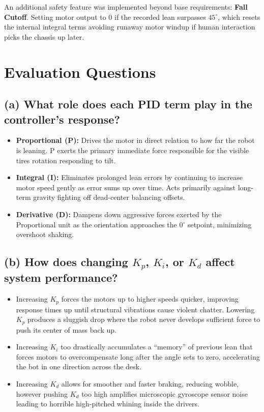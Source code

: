 \documentclass[12pt,a4paper]{article}
\begin{document}
An additional safety feature was implemented beyond base requirements: \textbf{Fall Cutoff}. Setting motor output to 0 if the recorded lean surpasses $45^\circ$, which resets the internal integral terms avoiding runaway motor windup if human interaction picks the chassis up later.

\section{Evaluation Questions}

\subsection{(a) What role does each PID term play in the controller's response?}
\begin{itemize}
    \item \textbf{Proportional (P):} Drives the motor in direct relation to how far the robot is leaning. P exerts the primary immediate force responsible for the visible tires rotation responding to tilt.
    \item \textbf{Integral (I):} Eliminates prolonged lean errors by continuing to increase motor speed gently as error sums up over time. Acts primarily against long-term gravity fighting off dead-center balancing offsets.
    \item \textbf{Derivative (D):} Dampens down aggressive forces exerted by the Proportional unit as the orientation approaches the 0$^\circ$ setpoint, minimizing overshoot shaking.
\end{itemize}

\subsection{(b) How does changing $K_p$, $K_i$, or $K_d$ affect system performance?}
\begin{itemize}
    \item Increasing $K_p$ forces the motors up to higher speeds quicker, improving response times up until structural vibrations cause violent chatter. Lowering $K_p$ produces a sluggish drop where the robot never develops sufficient force to push its center of mass back up.
    \item Increasing $K_i$ too drastically accumulates a ``memory'' of previous lean that forces motors to overcompensate long after the angle sets to zero, accelerating the bot in one direction across the desk.
    \item Increasing $K_d$ allows for smoother and faster braking, reducing wobble, however pushing $K_d$ too high amplifies microscopic gyroscope sensor noise leading to horrible high-pitched whining inside the drivers.
\end{itemize}
\end{document}

